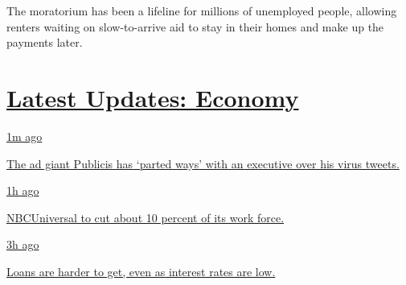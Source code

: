 The moratorium has been a lifeline for millions of unemployed people,
allowing renters waiting on slow-to-arrive aid to stay in their homes
and make up the payments later.

\hypertarget{latest-updates-economy}{%
\section{\texorpdfstring{\href{https://www.nytimes3xbfgragh.onion/live/2020/08/04/business/stock-market-today-coronavirus?action=click\&pgtype=Article\&state=default\&region=MAIN_CONTENT_1\&context=storylines_live_updates}{Latest
Updates:
Economy}}{Latest Updates: Economy}}\label{latest-updates-economy}}

\href{https://www.nytimes3xbfgragh.onion/live/2020/08/04/business/stock-market-today-coronavirus?action=click\&pgtype=Article\&state=default\&region=MAIN_CONTENT_1\&context=storylines_live_updates\#the-ad-giant-publicis-has-parted-ways-with-an-executive-over-his-virus-tweets}{1m
ago}

\href{https://www.nytimes3xbfgragh.onion/live/2020/08/04/business/stock-market-today-coronavirus?action=click\&pgtype=Article\&state=default\&region=MAIN_CONTENT_1\&context=storylines_live_updates\#the-ad-giant-publicis-has-parted-ways-with-an-executive-over-his-virus-tweets}{The
ad giant Publicis has `parted ways' with an executive over his virus
tweets.}

\href{https://www.nytimes3xbfgragh.onion/live/2020/08/04/business/stock-market-today-coronavirus?action=click\&pgtype=Article\&state=default\&region=MAIN_CONTENT_1\&context=storylines_live_updates\#nbcuniversal-to-cut-about-10-percent-of-its-work-force}{1h
ago}

\href{https://www.nytimes3xbfgragh.onion/live/2020/08/04/business/stock-market-today-coronavirus?action=click\&pgtype=Article\&state=default\&region=MAIN_CONTENT_1\&context=storylines_live_updates\#nbcuniversal-to-cut-about-10-percent-of-its-work-force}{NBCUniversal
to cut about 10 percent of its work force.}

\href{https://www.nytimes3xbfgragh.onion/live/2020/08/04/business/stock-market-today-coronavirus?action=click\&pgtype=Article\&state=default\&region=MAIN_CONTENT_1\&context=storylines_live_updates\#loans-are-harder-to-get-even-as-interest-rates-are-low}{3h
ago}

\href{https://www.nytimes3xbfgragh.onion/live/2020/08/04/business/stock-market-today-coronavirus?action=click\&pgtype=Article\&state=default\&region=MAIN_CONTENT_1\&context=storylines_live_updates\#loans-are-harder-to-get-even-as-interest-rates-are-low}{Loans
are harder to get, even as interest rates are low.}

